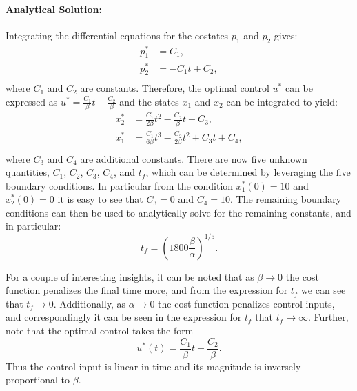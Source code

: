 \begin{example}
\paragraph{Analytical Solution:} 
Integrating the differential equations for the costates $p_1$ and $p_2$ gives:
\begin{equation*}
\begin{split}
p_1^* &= C_1, \\
p_2^* &= -C_1t + C_2, \\
\end{split}
\end{equation*}
where $C_1$ and $C_2$ are constants. Therefore, the optimal control $u^*$ can be expressed as $u^* = \frac{C_1}{\beta}t - \frac{C_2}{\beta}$ and the states $x_1$ and $x_2$ can be integrated to yield:
\begin{equation*}
\begin{split}
x_2^* &= \frac{C_1}{2\beta}t^2 - \frac{C_2}{\beta}t + C_3, \\
x_1^* &= \frac{C_1}{6\beta}t^3 - \frac{C_2}{2\beta}t^2 + C_3t + C_4, \\
\end{split}
\end{equation*}
where $C_3$ and $C_4$ are additional constants. There are now five unknown quantities, $C_1$, $C_2$, $C_3$, $C_4$, and $t_f$, which can be determined by leveraging the five boundary conditions. In particular from the condition $x_1^*(0) = 10$ and $x^*_2(0) = 0$ it is easy to see that $C_3 = 0$ and $C_4 = 10$. The remaining boundary conditions can then be used to analytically solve for the remaining constants, and in particular:
\begin{equation*}
t_f = (1800 \frac{\beta}{\alpha})^{1/5}.
\end{equation*}

For a couple of interesting insights, it can be noted that as $\beta \xrightarrow{} 0$ the cost function penalizes the final time more, and from the expression for $t_f$ we can see that $t_f \xrightarrow{} 0$. Additionally, as $\alpha \xrightarrow{} 0$ the cost function penalizes control inputs, and correspondingly it can be seen in the expression for $t_f$ that $t_f \xrightarrow{} \infty$. Further, note that the optimal control takes the form
\begin{equation*}
    u^*(t) = \frac{C_1}{\beta}t - \frac{C_2}{\beta}.
\end{equation*}
Thus the control input is linear in time and its magnitude is inversely proportional to $\beta$.
\end{example}

